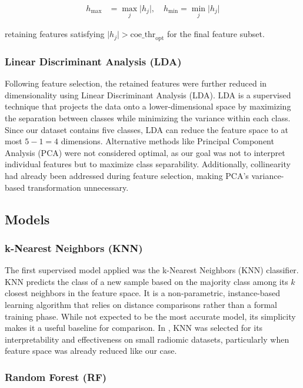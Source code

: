 \begin{align}
	h_{\text{max}} & = \max_{j} \lvert h_j \rvert, \quad
	h_{\text{min}} = \min_{j} \lvert h_j \rvert
\end{align}

retaining features satisfying \(\lvert h_j \rvert >
\text{coe\_thr}_{\text{opt}}\) for the final feature subset.

\subsubsection{Linear Discriminant Analysis (LDA)}

Following feature selection, the retained features were further reduced in
dimensionality using Linear Discriminant Analysis (LDA). LDA is a supervised
technique that projects the data onto a lower-dimensional space by maximizing
the separation between classes while minimizing the variance within each class.
Since our dataset contains five classes, LDA can reduce the feature space to at
most \(5 - 1 = 4\) dimensions. Alternative methods like Principal Component
Analysis (PCA) were not considered optimal, as our goal was not to interpret
individual features but to maximize class separability. Additionally,
collinearity had already been addressed during feature selection, making PCA's
variance-based transformation unnecessary.

\subsection{Models}

\subsubsection{k-Nearest Neighbors (KNN)}

The first supervised model applied was the k-Nearest Neighbors (KNN)
classifier. KNN predicts the class of a new sample based on the majority class
among its \(k\) closest neighbors in the feature space. It is a non-parametric,
instance-based learning algorithm that relies on distance comparisons rather
than a formal training phase. While not expected to be the most accurate model,
its simplicity makes it a useful baseline for comparison. In
\cite{pandey2023knn}, KNN was selected for its interpretability and
effectiveness on small radiomic datasets, particularly when feature space was
already reduced like our case.

\subsubsection{Random Forest (RF)}

